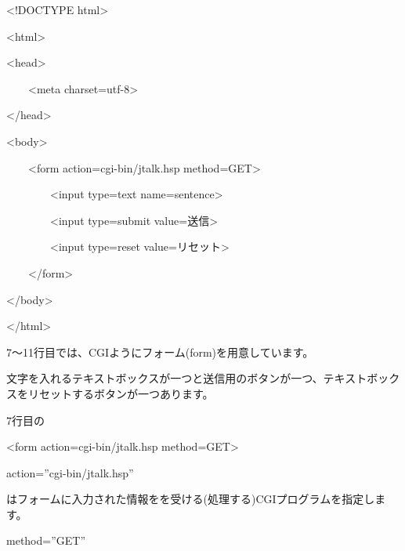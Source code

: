 \documentclass[a4paper,12pt,dvipdfmx]{jarticle}
\begin{document}
\centering
\begin{boxedminipage}{16.148cm}
	{\textless}!DOCTYPE html{\textgreater}

		{\textless}html{\textgreater}

	{\textless}head{\textgreater}

	\ \ \ \ {\textless}meta charset={\textquotedbl}utf-8{\textquotedbl}{\textgreater}

	{\textless}/head{\textgreater}

	{\textless}body{\textgreater}

	\ \ \ \ {\textless}form action={\textquotedbl}cgi-bin/jtalk.hsp{\textquotedbl}
	method={\textquotedbl}GET{\textquotedbl}{\textgreater}

	\ \ \ \ \ \ \ \ {\textless}input type={\textquotedbl}text{\textquotedbl}
	name={\textquotedbl}sentence{\textquotedbl}{\textgreater}

	\ \ \ \ \ \ \ \ {\textless}input type={\textquotedbl}submit{\textquotedbl}
	value={\textquotedbl}送信{\textquotedbl}{\textgreater}

	\ \ \ \ \ \ \ \ {\textless}input type={\textquotedbl}reset{\textquotedbl}
	value={\textquotedbl}リセット{\textquotedbl}{\textgreater}

	\ \ \ \ {\textless}/form{\textgreater}

	{\textless}/body{\textgreater}

	{\textless}/html{\textgreater}
\end{boxedminipage}
\flushleft
\bigskip


\bigskip


\bigskip



\bigskip

7〜11行目では、CGIようにフォーム(form)を用意しています。

文字を入れるテキストボックスが一つと送信用のボタンが一つ、テキストボックスをリセットするボタンが一つあります。

%


7行目の

{\textless}form action={\textquotedbl}cgi-bin/jtalk.hsp{\textquotedbl}
method={\textquotedbl}GET{\textquotedbl}{\textgreater}

action=”cgi-bin/jtalk.hsp”

はフォームに入力された情報をを受ける(処理する)CGIプログラムを指定します。

method=”GET”
\end{document}
